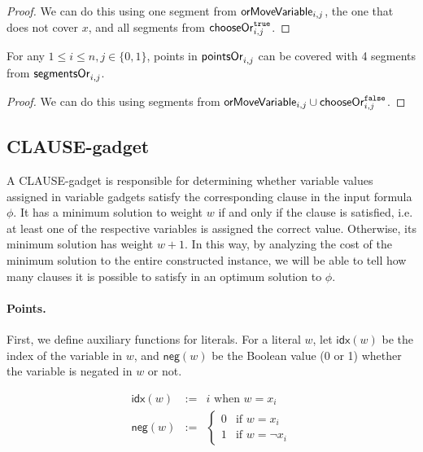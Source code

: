 \begin{proof}
We can do this using one segment from
$\mathsf{orMoveVariable}_{i,j}$, the one that does not cover $x$,
and all segments from $\mathsf{chooseOr}^{\texttt{true}}_{i,j}$.
\end{proof}

\begin{lemma}
\label{cover_or_false}
For any $1 \le i \le n, j \in \{0, 1\}$, points in
$\mathsf{pointsOr}_{i,j}$ can be covered
with 4 segments from $\mathsf{segmentsOr}_{i,j}$.
\end{lemma}

\begin{proof}
We can do this using segments from $\mathsf{orMoveVariable}_{i,j} \cup \mathsf{chooseOr}^{\texttt{false}}_{i,j}$.
\end{proof}


\subsection{CLAUSE-gadget}
A CLAUSE-gadget is responsible for determining whether
variable values assigned in variable gadgets
satisfy the corresponding clause in the input formula $\phi$.
It has a minimum solution to weight $w$
if and only if the clause is satisfied, i.e. at least one
of the respective variables is assigned the correct value.
Otherwise, its minimum solution has weight $w+1$.
In this way, by analyzing the cost of the minimum
solution to the entire constructed instance, we will be able to tell
how many clauses it is possible to satisfy
in an optimum solution to $\phi$.


\paragraph{Points.}

\newcommand{\pointsClause}[1]{\mathsf{pointsClause}_{#1}}
\newcommand{\negate}{\mathsf{neg}}
\newcommand{\idx}{\mathsf{idx}}


First, we define auxiliary functions for literals. 
For a literal $w$, let $\idx(w)$ be the index of the variable in $w$,
and $\negate(w)$ be the Boolean value (0 or 1) whether the variable is negated in $w$
or not.

\begin{eqnarray*}
\idx(w) & := &  i \text{ when } w = x_i \\
\negate(w) & := & 
\begin{cases}
 0 & \text{if } w = x_i \\
 1 & \text{if } w = \neg x_i
\end{cases}
\end{eqnarray*}

